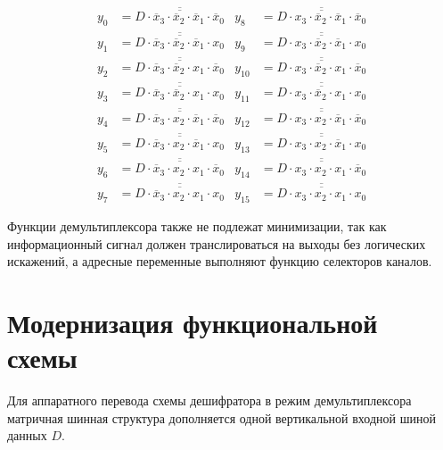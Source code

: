 \documentclass[oneside,a4paper,14pt]{extarticle}
\begin{document}
\begin{align*}
  y_0  &= \overline{\overline{D \cdot \overline{x}_3 \cdot \overline{x}_2 \cdot \overline{x}_1 \cdot \overline{x}_0}} & 
  y_8  &= \overline{\overline{D \cdot x_3 \cdot \overline{x}_2 \cdot \overline{x}_1 \cdot \overline{x}_0}} \\
  y_1  &= \overline{\overline{D \cdot \overline{x}_3 \cdot \overline{x}_2 \cdot \overline{x}_1 \cdot x_0}} & 
  y_9  &= \overline{\overline{D \cdot x_3 \cdot \overline{x}_2 \cdot \overline{x}_1 \cdot x_0}} \\
  y_2  &= \overline{\overline{D \cdot \overline{x}_3 \cdot \overline{x}_2 \cdot x_1 \cdot \overline{x}_0}} & 
  y_{10} &= \overline{\overline{D \cdot x_3 \cdot \overline{x}_2 \cdot x_1 \cdot \overline{x}_0}} \\
  y_3  &= \overline{\overline{D \cdot \overline{x}_3 \cdot \overline{x}_2 \cdot x_1 \cdot x_0}} & 
  y_{11} &= \overline{\overline{D \cdot x_3 \cdot \overline{x}_2 \cdot x_1 \cdot x_0}} \\
  y_4  &= \overline{\overline{D \cdot \overline{x}_3 \cdot x_2 \cdot \overline{x}_1 \cdot \overline{x}_0}} & 
  y_{12} &= \overline{\overline{D \cdot x_3 \cdot x_2 \cdot \overline{x}_1 \cdot \overline{x}_0}} \\
  y_5  &= \overline{\overline{D \cdot \overline{x}_3 \cdot x_2 \cdot \overline{x}_1 \cdot x_0}} & 
  y_{13} &= \overline{\overline{D \cdot x_3 \cdot x_2 \cdot \overline{x}_1 \cdot x_0}} \\
  y_6  &= \overline{\overline{D \cdot \overline{x}_3 \cdot x_2 \cdot x_1 \cdot \overline{x}_0}} & 
  y_{14} &= \overline{\overline{D \cdot x_3 \cdot x_2 \cdot x_1 \cdot \overline{x}_0}} \\
  y_7  &= \overline{\overline{D \cdot \overline{x}_3 \cdot x_2 \cdot x_1 \cdot x_0}} & 
  y_{15} &= \overline{\overline{D \cdot x_3 \cdot x_2 \cdot x_1 \cdot x_0}}
\end{align*}

Функции демультиплексора также не подлежат минимизации, так как информационный сигнал должен транслироваться на выходы без логических искажений, а адресные переменные выполняют функцию селекторов каналов.

\section{Модернизация функциональной схемы}
Для аппаратного перевода схемы дешифратора в режим демультиплексора матричная шинная структура дополняется одной вертикальной входной шиной данных $D$. 
\end{document}
